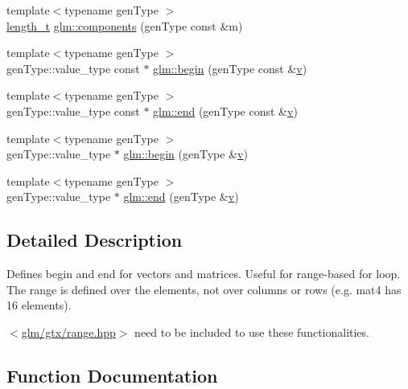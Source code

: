 \begin{DoxyCompactItemize}
\item 
{\footnotesize template$<$typename gen\+Type $>$ }\\\mbox{\hyperlink{namespaceglm_a090a0de2260835bee80e71a702492ed9}{length\+\_\+t}} \mbox{\hyperlink{group__gtx__range_ga946358ba868fc33d234e7ee3ac1b7912}{glm\+::components}} (gen\+Type const \&m)
\item 
{\footnotesize template$<$typename gen\+Type $>$ }\\gen\+Type\+::value\+\_\+type const  $\ast$ \mbox{\hyperlink{group__gtx__range_gaadcca0cd1ffc54deb39e983bfdcbcdd2}{glm\+::begin}} (gen\+Type const \&\mbox{\hyperlink{glad_8h_a14cfbe2fc2234f5504618905b69d1e06}{v}})
\item 
{\footnotesize template$<$typename gen\+Type $>$ }\\gen\+Type\+::value\+\_\+type const  $\ast$ \mbox{\hyperlink{group__gtx__range_ga785aa0c9cf7d925318863f950eb81618}{glm\+::end}} (gen\+Type const \&\mbox{\hyperlink{glad_8h_a14cfbe2fc2234f5504618905b69d1e06}{v}})
\item 
{\footnotesize template$<$typename gen\+Type $>$ }\\gen\+Type\+::value\+\_\+type $\ast$ \mbox{\hyperlink{group__gtx__range_gacc3851df89b9238430e39525c3518ced}{glm\+::begin}} (gen\+Type \&\mbox{\hyperlink{glad_8h_a14cfbe2fc2234f5504618905b69d1e06}{v}})
\item 
{\footnotesize template$<$typename gen\+Type $>$ }\\gen\+Type\+::value\+\_\+type $\ast$ \mbox{\hyperlink{group__gtx__range_ga0c303e8c522b139252646a93d5e490d4}{glm\+::end}} (gen\+Type \&\mbox{\hyperlink{glad_8h_a14cfbe2fc2234f5504618905b69d1e06}{v}})
\end{DoxyCompactItemize}


\subsection{Detailed Description}
Defines begin and end for vectors and matrices. Useful for range-\/based for loop. The range is defined over the elements, not over columns or rows (e.\+g. mat4 has 16 elements). 

$<$\mbox{\hyperlink{range_8hpp}{glm/gtx/range.\+hpp}}$>$ need to be included to use these functionalities. 

\subsection{Function Documentation}
\mbox{\label{group__gtx__range_gaadcca0cd1ffc54deb39e983bfdcbcdd2}} 
